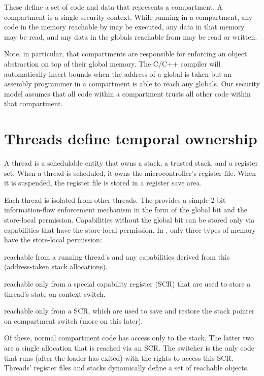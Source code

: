 These define a set of code and data that represents a compartment.
A compartment is a single security context.
While running in a compartment, any code in the memory reachable by \PCC{} may be executed, any data in that memory may be read, and any data in the globals reachable from \CGP{} may be read or written.

Note, in particular, that compartments are responsible for enforcing an object abstraction on top of their global memory.
The C/C++ compiler will automatically insert bounds when the address of a global is taken but an assembly programmer in a compartment is able to reach any globals.
Our security model assumes that all code within a compartment trusts all other code within that compartment.

\section{Threads define temporal ownership}

A \cherimcuos{} thread is a schedulable entity that owns a stack, a trusted stack, and a register set.
When a thread is scheduled, it owns the microcontroller's register file.
When it is suspended, the register file is stored in a register save area.

Each thread is isolated from other threads.
The \cherimcuisa{} provides a simple 2-bit information-flow enforcement mechanism in the form of the global bit and the store-local permission.
Capabilities without the global bit can be stored only via capabilities that have the store-local permission.
In \cherimcuos{}, only three types of memory have the store-local permission:

\begin{description}[before={\renewcommand\makelabel[1]{\textbf{##1},}}]
	\item[Stacks] reachable from a running thread's \CSP{} and any capabilities derived from this (address-taken stack allocations).
	\item[Register save areas] reachable only from a special capability register (SCR) that are used to store a thread's state on context switch.
	\item[Trusted stacks] reachable only from a SCR, which are used to save and restore the stack pointer on compartment switch (more on this later).
\end{description}

Of these, normal compartment code has access only to the stack.
The latter two are a single allocation that is reached via an SCR.
The switcher is the only code that runs (after the loader has exited) with the rights to access this SCR.
Threads' register files and stacks dynamically define a set of reachable objects.

